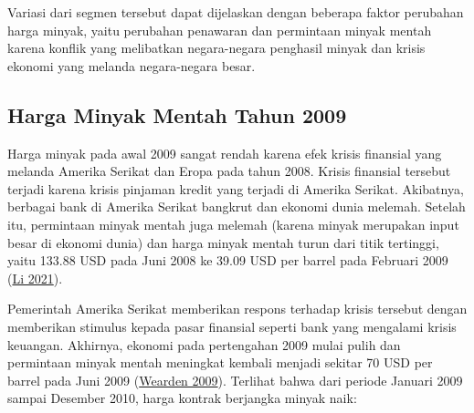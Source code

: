 \documentclass[
]{book}
\begin{document}
Variasi dari segmen tersebut dapat dijelaskan dengan beberapa faktor perubahan harga minyak, yaitu perubahan penawaran dan permintaan minyak mentah karena konflik yang melibatkan negara-negara penghasil minyak dan krisis ekonomi yang melanda negara-negara besar.

\hypertarget{harga-minyak-mentah-tahun-2009}{%
\subsection{Harga Minyak Mentah Tahun 2009}\label{harga-minyak-mentah-tahun-2009}}

Harga minyak pada awal 2009 sangat rendah karena efek krisis finansial yang melanda Amerika Serikat dan Eropa pada tahun 2008. Krisis finansial tersebut terjadi karena krisis pinjaman kredit yang terjadi di Amerika Serikat. Akibatnya, berbagai bank di Amerika Serikat bangkrut dan ekonomi dunia melemah. Setelah itu, permintaan minyak mentah juga melemah (karena minyak merupakan input besar di ekonomi dunia) dan harga minyak mentah turun dari titik tertinggi, yaitu 133.88 USD pada Juni 2008 ke 39.09 USD per barrel pada Februari 2009 (\protect\hyperlink{ref-tlioil}{Li 2021}).

Pemerintah Amerika Serikat memberikan respons terhadap krisis tersebut dengan memberikan stimulus kepada pasar finansial seperti bank yang mengalami krisis keuangan. Akhirnya, ekonomi pada pertengahan 2009 mulai pulih dan permintaan minyak mentah meningkat kembali menjadi sekitar 70 USD per barrel pada Juni 2009 (\protect\hyperlink{ref-guardoil}{Wearden 2009}). Terlihat bahwa dari periode Januari 2009 sampai Desember 2010, harga kontrak berjangka minyak naik:
\end{document}

